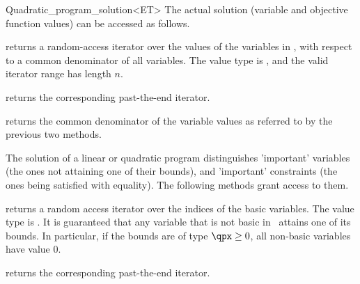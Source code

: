 \begin{ccRefClass}{Quadratic_program_solution<ET>}
The actual solution (variable and objective function values) can be
accessed as follows.






{returns a random-access iterator  over the values 
of the variables in \ccVar, with respect to a common
denominator of all variables. The value type is , and the valid
iterator range has length $n$.}

{returns the corresponding past-the-end iterator.}

{returns the common denominator of the variable values as referred to
by the previous two methods.}

The solution of a linear or quadratic program distinguishes 'important'
variables (the ones not attaining one of their bounds), and 'important'
constraints (the ones being satisfied with equality). The following
methods grant access to them.

{returns a random access iterator over the indices of the basic
variables. The value type is . It is guaranteed that any 
variable that is not basic in \ccVar\ attains one of its bounds. 
In particular, if the bounds are of type $\qpx\geq 0$, all non-basic 
variables have value $0$.}

{returns the corresponding past-the-end iterator.}


\end{ccRefClass}
